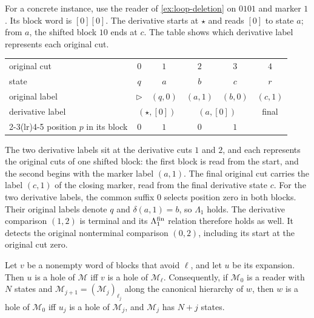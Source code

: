 For a concrete instance, use the reader of \cref{ex:loop-deletion}
on $0101$ and marker $1$. Its block word is $[0][0]$. The derivative
starts at $\star$ and reads $[0]$ to state $a$; from $a$, the shifted
block $10$ ends at $c$. The table shows which derivative label represents
each original cut.
\begin{center}
\small
\begin{tabular}{@{}lccccc@{}}
\toprule
original cut & $0$ & $1$ & $2$ & $3$ & $4$\\
state & $q$ & $a$ & $b$ & $c$ & $r$\\
original label & $\triangleright$ & $(q,0)$ & $(a,1)$ & $(b,0)$ & $(c,1)$\\
\midrule
derivative label & \multicolumn{2}{c}{$(\star,[0])$} & \multicolumn{2}{c}{$(a,[0])$} & final\\
\cmidrule(lr){2-3}\cmidrule(lr){4-5}
position $p$ in its block & $0$ & $1$ & $0$ & $1$ & \\
\bottomrule
\end{tabular}
\end{center}
The two derivative labels sit at the derivative cuts $1$ and $2$, and each
represents the original cuts of one shifted block: the first block is read from
the start, and the second begins with the marker label $(a,1)$. The final original
cut carries the label $(c,1)$ of the closing marker, read from the final derivative
state $c$. For the two derivative labels, the common suffix $0$ selects position
zero in both blocks. Their original labels denote $q$ and $\delta(a,1)=b$, so
$\Lambda_1$ holds. The derivative comparison $(1,2)$ is terminal and its $\Lambda^{\mathrm{fin}}_1$
relation therefore holds as well. It detects the original nonterminal comparison
$(0,2)$, including its start at the original cut zero.

\begin{lemma}\label{lem:der-holes}
Let $v$ be a nonempty word of blocks that avoid $\ell$, and let $u$ be its expansion. Then
$u$ is a hole of $\mathcal{M}$ iff $v$ is a hole of $\mathcal{M}_\ell$. Consequently, if
$\mathcal{M}_0$ is a reader with $N$ states and $\mathcal{M}_{j+1} = (\mathcal{M}_j)_{\ell_j}$
along the canonical hierarchy of $w$, then $w$ is a hole of $\mathcal{M}_0$ iff $u_j$ is a
hole of $\mathcal{M}_j$, and $\mathcal{M}_j$ has $N + j$ states.
\end{lemma}

